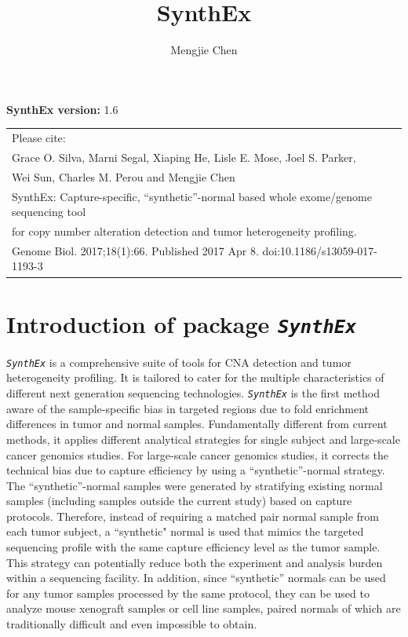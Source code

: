 \documentclass{article}
\author{Mengjie Chen}
\title{SynthEx}
\newcommand{\pkg}[1]{\texttt{\textsl{#1}}}
\begin{document}


\maketitle

  \vspace{1em}

  \textbf{SynthEx version:} 1.6

  \vspace{1em}

  \begin{center}
    \begin{tabular}{ | l | }
      \hline
     Please cite:  \\
     Grace O. Silva, Marni Segal, Xiaping He, Lisle E. Mose, Joel S. Parker, \\
     Wei Sun, Charles M. Perou and Mengjie Chen \\
     SynthEx: Capture-specific, ``synthetic''-normal based whole exome/genome sequencing tool \\
     for copy number alteration detection and tumor heterogeneity profiling. \\
      Genome Biol. 2017;18(1):66. Published 2017 Apr 8. doi:10.1186/s13059-017-1193-3 \\
      \hline
    \end{tabular}
  \end{center}



\newpage

\tableofcontents

\newpage


\section{Introduction of package \pkg{SynthEx}}
\pkg{SynthEx} is a comprehensive suite of tools for CNA detection and tumor heterogeneity profiling. It is tailored to cater for the multiple characteristics of different next generation sequencing technologies. \pkg{SynthEx} is the first method aware of the sample-specific bias in targeted regions due to fold enrichment differences in tumor and normal samples. Fundamentally different from current methods, it applies different analytical strategies for single subject and large-scale cancer genomics studies. For large-scale cancer genomics studies, it corrects the technical bias due to capture efficiency by using a ``synthetic''-normal strategy. The ``synthetic''-normal samples were generated by stratifying existing normal samples (including samples outside the current study) based on capture protocols. Therefore, instead of requiring a matched pair normal sample from each tumor subject, a ``synthetic" normal is used that mimics the targeted sequencing profile with the same capture efficiency level as the tumor sample. This strategy can potentially reduce both the experiment and analysis burden within a sequencing facility. In addition, since ``synthetic'' normals can be used for any tumor samples processed by the same protocol, they can be used to analyze mouse xenograft samples or cell line samples, paired normals of which are traditionally difficult and even impossible to obtain.
\end{document}

